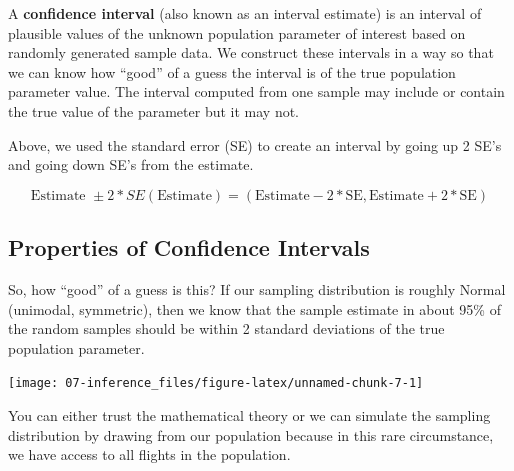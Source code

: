 \documentclass[
]{book}
\begin{document}
A \textbf{confidence interval} (also known as an interval estimate) is an interval of plausible values of the unknown population parameter of interest based on randomly generated sample data. We construct these intervals in a way so that we can know how ``good'' of a guess the interval is of the true population parameter value. The interval computed from one sample may include or contain the true value of the parameter but it may not.

Above, we used the standard error (SE) to create an interval by going up 2 SE's and going down SE's from the estimate.

\[\text{Estimate }\pm 2*SE(\text{Estimate}) = (\text{Estimate} - 2*\text{SE}, \text{Estimate} + 2*\text{SE})\]

\subsection{Properties of Confidence Intervals}\label{properties-of-confidence-intervals}

So, how ``good'' of a guess is this? If our sampling distribution is roughly Normal (unimodal, symmetric), then we know that the sample estimate in about 95\% of the random samples should be within 2 standard deviations of the true population parameter.

\begin{center}\texttt{[image: 07-inference\_files/figure-latex/unnamed-chunk-7-1]} \end{center}

You can either trust the mathematical theory or we can simulate the sampling distribution by drawing from our population because in this rare circumstance, we have access to all flights in the population.
\end{document}
